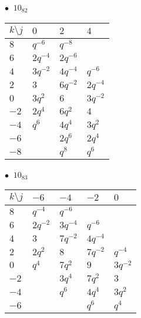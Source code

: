 \begin{minipage}{\linewidth}
$\bullet\ $ $10_{82}$ \vspace{0.5em} \\
\begin{tabular}{l|lll}
$k \setminus j$ & $0$ & $2$ & $4$ \\
\hline
$8$ & $q^{-6}$ & $q^{-8}$ &  \\
$6$ & $2q^{-4}$ & $2q^{-6}$ &  \\
$4$ & $3q^{-2}$ & $4q^{-4}$ & $q^{-6}$ \\
$2$ & $3$ & $6q^{-2}$ & $2q^{-4}$ \\
$0$ & $3q^{2}$ & $6$ & $3q^{-2}$ \\
$-2$ & $2q^{4}$ & $6q^{2}$ & $4$ \\
$-4$ & $q^{6}$ & $4q^{4}$ & $3q^{2}$ \\
$-6$ &  & $2q^{6}$ & $2q^{4}$ \\
$-8$ &  & $q^{8}$ & $q^{6}$ \\
\end{tabular}
\vspace{2em}
\end{minipage}
%
\begin{minipage}{\linewidth}
$\bullet\ $ $10_{83}$ \vspace{0.5em} \\
\begin{tabular}{l|llll}
$k \setminus j$ & $-6$ & $-4$ & $-2$ & $0$ \\
\hline
$8$ & $q^{-4}$ & $q^{-6}$ &  &  \\
$6$ & $2q^{-2}$ & $3q^{-4}$ & $q^{-6}$ &  \\
$4$ & $3$ & $7q^{-2}$ & $4q^{-4}$ &  \\
$2$ & $2q^{2}$ & $8$ & $7q^{-2}$ & $q^{-4}$ \\
$0$ & $q^{4}$ & $7q^{2}$ & $9$ & $3q^{-2}$ \\
$-2$ &  & $3q^{4}$ & $7q^{2}$ & $3$ \\
$-4$ &  & $q^{6}$ & $4q^{4}$ & $3q^{2}$ \\
$-6$ &  &  & $q^{6}$ & $q^{4}$ \\
\end{tabular}
\vspace{2em}
\end{minipage}
%

